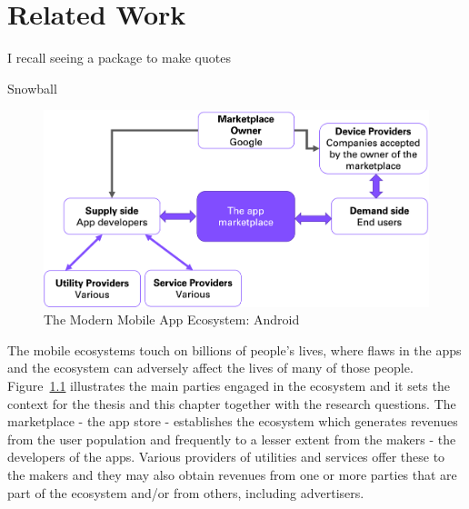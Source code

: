 \setchapterpreamble[u]{\margintoc}
\chapter{Related Work}
\label{chapter-related-work}
\epigraph{I recall seeing a package to make quotes}{Snowball} %


\begin{figure}[b!]
    \centering
    \includegraphics[width=0.9\linewidth]{images/my/android-app-ecosystem-main-players.png}
    \caption{The Modern Mobile App Ecosystem: Android}
    \label{fig:my_modern-mobile-app-ecosystem}
\end{figure}

The mobile ecosystems touch on billions of people's lives, where flaws in the apps and the ecosystem can adversely affect the lives of many of those people. Figure~\ref{fig:my_modern-mobile-app-ecosystem} illustrates the main parties engaged in the ecosystem %
and it sets the context for the thesis and this chapter together with the research questions. The marketplace - the app store - establishes the ecosystem which generates revenues from the user population and frequently to a lesser extent from the makers -  the developers of the apps. Various providers of utilities and services offer these to the makers and they may also obtain revenues from one or more parties that are part of the ecosystem and/or from others, including advertisers.

